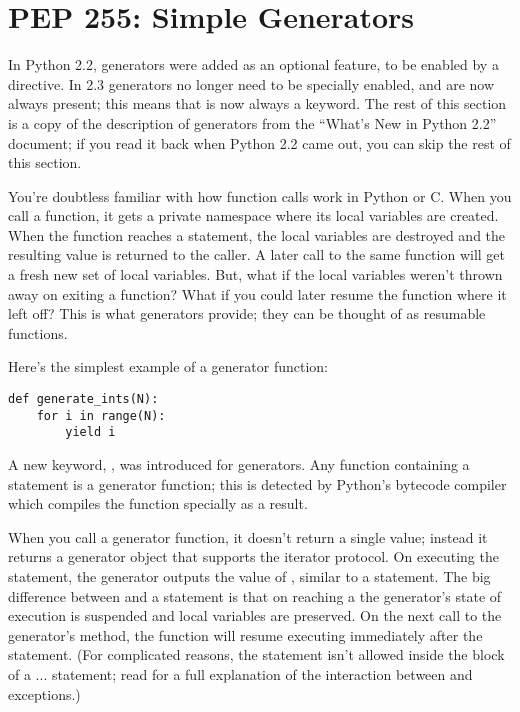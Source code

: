 \documentclass{howto}
\begin{document}
\section{PEP 255: Simple Generators\label{section-generators}}

In Python 2.2, generators were added as an optional feature, to be
enabled by a  directive.  In
2.3 generators no longer need to be specially enabled, and are now
always present; this means that  is now always a
keyword.  The rest of this section is a copy of the description of
generators from the ``What's New in Python 2.2'' document; if you read
it back when Python 2.2 came out, you can skip the rest of this section.

You're doubtless familiar with how function calls work in Python or C.
When you call a function, it gets a private namespace where its local
variables are created.  When the function reaches a 
statement, the local variables are destroyed and the resulting value
is returned to the caller.  A later call to the same function will get
a fresh new set of local variables. But, what if the local variables
weren't thrown away on exiting a function?  What if you could later
resume the function where it left off?  This is what generators
provide; they can be thought of as resumable functions.

Here's the simplest example of a generator function:

\begin{verbatim}
def generate_ints(N):
    for i in range(N):
        yield i
\end{verbatim}

A new keyword, , was introduced for generators.  Any
function containing a  statement is a generator
function; this is detected by Python's bytecode compiler which
compiles the function specially as a result.

When you call a generator function, it doesn't return a single value;
instead it returns a generator object that supports the iterator
protocol.  On executing the  statement, the generator
outputs the value of , similar to a 
statement.  The big difference between  and a
 statement is that on reaching a  the
generator's state of execution is suspended and local variables are
preserved.  On the next call to the generator's  method,
the function will resume executing immediately after the
 statement.  (For complicated reasons, the
 statement isn't allowed inside the  block
of a ... statement; read  for a full
explanation of the interaction between  and
exceptions.)
\end{document}
